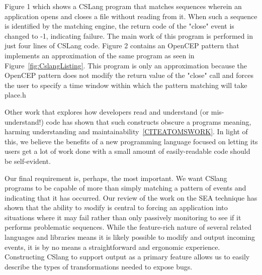 Figure 1 which shows a CSLang program that matches sequences wherein an
application opens and closes a file without reading from it. When such a
sequence is identified by the matching engine, the return code of the
"close" event is changed to -1, indicating failure. The main work of this
program is performed in just four lines of CSLang code.  Figure 2 contains
an OpenCEP\cite{open_cep_website} pattern that implements an approximation
of the same program as seen in Figure~\ref{fig:CslangListing}.
This program is only
an approximation because the OpenCEP pattern does not modify the return
value of the "close" call and forces the user to specify a time window
within which the pattern matching will take place.h

Other work that explores how developers read and
understand (or mis-understand!) code has shown that such constructs obscure
a programs meaning, harming understanding and
maintainability~\ref{CITEATOMSWORK}.
In light of this, we believe the benefits of a
new programming language
focused on letting its users get a lot of work done
with a small amount of easily-readable code should be self-evident.


Our final requirement is, perhaps, the most important.
We want CSlang programs to be capable of more than simply matching
a pattern of events and indicating that it has occurred.
Our review of the work on the SEA technique has shown that the ability to
{\textit modify} is central to forcing an application into situations where
it may fail rather than only passively monitoring to see if it performs
problematic sequences.  While the feature-rich nature of several related
languages and libraries means it is likely possible to modify and output
incoming events, it is by no means a straightforward
and ergonomic experience.
Constructing CSlang to support output as a primary feature allows us to
easily describe the types of transformations needed to expose bugs.


